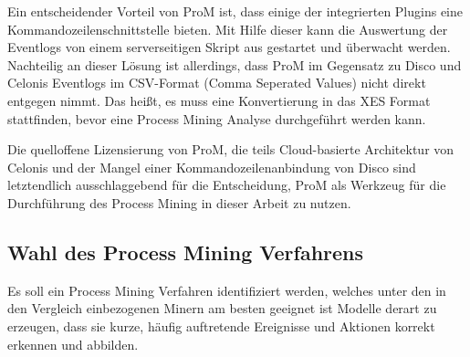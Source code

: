 \begin{table}[!h]
\centering
{}
\caption{Gegenüberstellung von technischen Eigenschaften der populärsten Process Mining Lösungen(Quelle: Erling C., Vergleich und Evaluation von Process Mining Software, 2019, S. 36,37,44,83 \ref{comparison2})}
\label{comparison2}
\end{table}

Ein entscheidender Vorteil von ProM ist, dass einige der integrierten Plugins eine Kommandozeilenschnittstelle bieten. Mit Hilfe dieser kann die Auswertung der Eventlogs von einem serverseitigen Skript aus gestartet und überwacht werden. Nachteilig an dieser Lösung ist allerdings, dass ProM im Gegensatz zu Disco und Celonis Eventlogs im CSV-Format (Comma Seperated Values) nicht direkt entgegen nimmt. Das heißt, es muss eine Konvertierung in das XES Format stattfinden, bevor eine Process Mining Analyse durchgeführt werden kann.

Die quelloffene Lizensierung von ProM, die teils Cloud-basierte Architektur von Celonis und der Mangel einer Kommandozeilenanbindung von Disco sind letztendlich ausschlaggebend für die Entscheidung, ProM als Werkzeug für die Durchführung des Process Mining in dieser Arbeit zu nutzen. 

\subsection{Wahl des Process Mining Verfahrens}
Es soll ein Process Mining Verfahren identifiziert werden, welches unter den in den Vergleich einbezogenen Minern am besten geeignet ist Modelle derart zu erzeugen, dass sie kurze, häufig auftretende Ereignisse und Aktionen korrekt erkennen und abbilden. 


